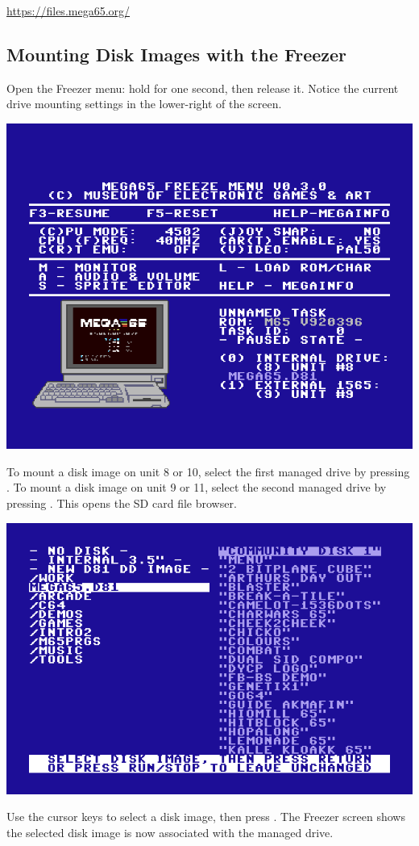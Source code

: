 \url{https://files.mega65.org/}

\subsection{Mounting Disk Images with the Freezer}

Open the Freezer menu: hold  for one second, then release it. Notice the current drive mounting settings in the lower-right of the screen.

\begin{center}
  \includegraphics[width=0.7\linewidth]{images/freezer.png}
\end{center}

To mount a disk image on unit 8 or 10, select the first managed drive by pressing . To mount a disk image on unit 9 or 11, select the second managed drive by pressing . This opens the SD card file browser.

\begin{center}
  \includegraphics[width=0.7\linewidth]{images/d81-file-browser.png}
\end{center}

Use the cursor keys to select a disk image, then press . The Freezer screen shows the selected disk image is now associated with the managed drive.

